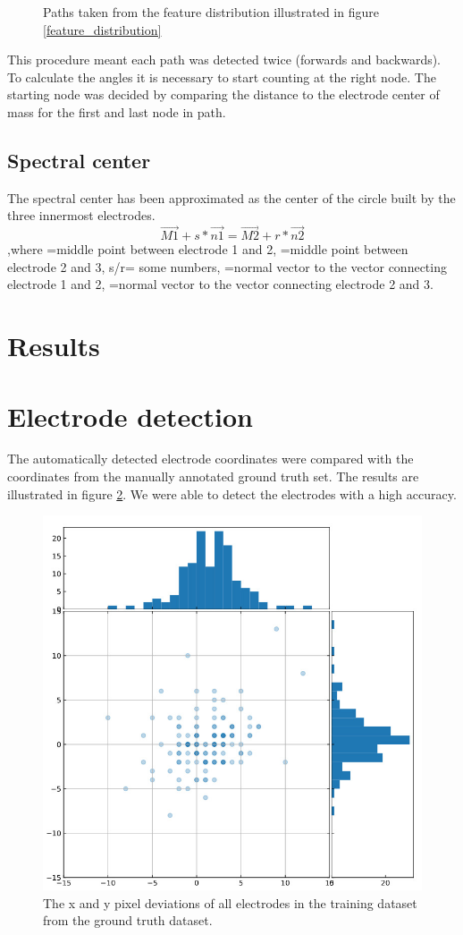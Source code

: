 \documentclass[a4paper, 11pt]{article}
\begin{document}
\begin{figure}[ht]
\begin{subfigure}[c]{0.32\textwidth}
\end{subfigure}
\caption{Paths taken from the feature distribution illustrated in figure \ref{feature_distribution}}
\label{graphs}
\end{figure}
This procedure meant each path was detected twice (forwards and backwards). To calculate the angles it is necessary to start counting at the right node. The starting node was decided by comparing the distance to the electrode center of mass for the first and last node in path.

\subsection{Spectral center}
The spectral center has been approximated as the center of the circle built by the three innermost electrodes.
$$\overrightarrow{M1}+s*\overrightarrow{n1}=\overrightarrow{M2}+r*\overrightarrow{n2}$$ ,where =middle point between electrode 1 and 2, =middle point between electrode 2 and 3, s/r= some numbers, =normal vector to the vector connecting electrode 1 and 2, =normal vector to the vector connecting electrode 2 and 3.


\section{Results}

\section{Electrode detection}
The automatically detected electrode coordinates were compared with the coordinates from the manually annotated ground truth set. The results are illustrated in figure \ref{results_coord}. We were able to detect the electrodes with a high accuracy.

\begin{figure}[ht]
	\centering
  \includegraphics[width=.5\textwidth]{results_coord.jpeg}
	\caption{The x and y pixel deviations of all electrodes in the training dataset from the ground truth dataset.}
	\label{results_coord}
\end{figure}
\end{document}
